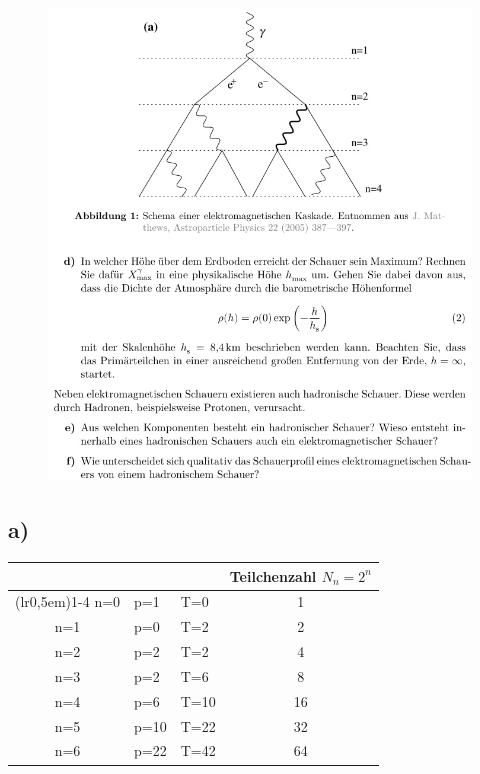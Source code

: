     \begin{figure}[H]
        \centering
        \includegraphics[width=\textwidth]{images/Aufgabe19b.jpg}
        \label{fig:2}
    \end{figure}

\subsection{a)}

\begin{table}[H]
\centering
    \begin{tabular}{c l l c}
    \toprule
    \multicolumn{1}{c}{} & \multicolumn{1}{c}{} & \multicolumn{1}{c}{} & \multicolumn{1}{c}{Teilchenzahl $N_n=2^n$}\\
    \cmidrule(lr{0,5em}){1-4}
    n=0 & p=1 & T=0 & 1\\        
    n=1 & p=0 & T=2 & 2\\       
    n=2 & p=2 & T=2 & 4\\
    n=3 & p=2 & T=6 & 8\\
    n=4 & p=6 & T=10 & 16\\
    n=5 & p=10 & T=22 & 32\\        
    n=6 & p=22 & T=42 & 64\\
    \bottomrule
    \end{tabular}
\label{tab:1}
\end{table}

